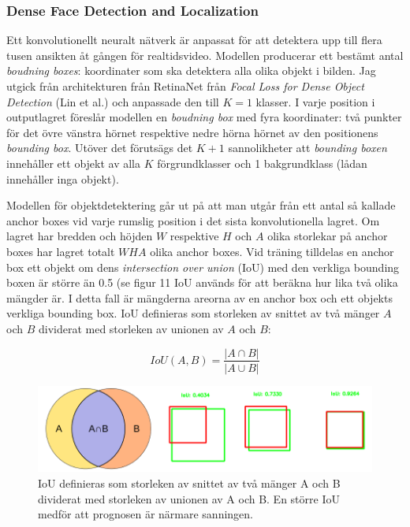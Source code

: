 \documentclass[a4paper,11pt,twoside]{article}
\begin{document}
\subsubsection{Dense Face Detection and Localization}
Ett konvolutionellt neuralt nätverk är anpassat för att detektera upp till flera tusen ansikten åt gången för realtidsvideo. Modellen producerar ett bestämt antal \textit{boudning boxes}: koordinater som ska detektera alla olika objekt i bilden. Jag utgick från architekturen från RetinaNet från \textit{Focal Loss for Dense Object Detection} (Lin et al.) och anpassade den till $K = 1$ klasser. I varje position i outputlagret föreslår modellen en \textit{boudning box} med fyra koordinater: två punkter för det övre vänstra hörnet respektive nedre hörna hörnet av den positionens \textit{bounding box}. Utöver det förutsägs det $K+1$ sannolikheter att \textit{bounding boxen} innehåller ett objekt av alla $K$ förgrundklasser och 1 bakgrundklass (lådan innehåller inga objekt).\cite{cs231n}\cite{retinanet}

Modellen för objektdetektering går ut på att man utgår från ett antal så kallade anchor boxes vid varje rumslig position i det sista konvolutionella lagret. Om lagret har bredden och höjden $W$ respektive $H$ och $A$ olika storlekar på anchor boxes har lagret totalt $WHA$ olika anchor boxes. Vid träning tilldelas en anchor box ett objekt om dens \textit{intersection over union} (IoU) med den verkliga bounding boxen är större än 0.5 (se figur 11 IoU används för att beräkna hur lika två olika mängder är. I detta fall är mängderna areorna av en anchor box och ett objekts verkliga bounding box. IoU definieras som storleken av snittet av två mänger $A$ och $B$ dividerat med storleken av unionen av $A$ och $B$: \cite{cs231n} \cite{iou}

\begin{equation}
IoU(A, B)=\frac{|A \cap B|}{|A \cup B|}
\end{equation}

\begin{figure}[h]\label{figiou}
	\centering
  		\includegraphics[scale=0.5]{iou.png}
  	\caption{IoU definieras som storleken av snittet av två mänger A och B dividerat med storleken av unionen av A och B. En större IoU medför att prognosen är närmare sanningen. \cite{iou}}
\end{figure}
\end{document}
